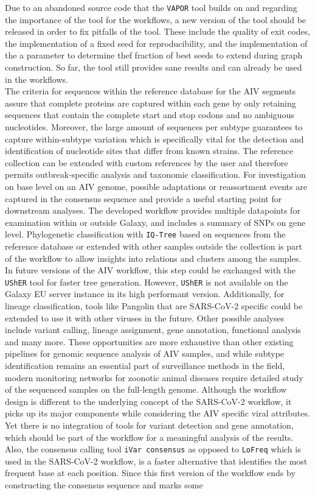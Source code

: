 Due to an abandoned source code that the \texttt{VAPOR} tool builds on and regarding the importance of the tool for the workflows, a new version of the tool should be released in order to fix pitfalls of the tool. These include the quality of exit codes, the implementation of a fixed seed for reproducibility, and the implementation of the a parameter to determine thef fraction of best seeds to extend during graph construction. So far, the tool still provides sane results and can already be used in the workflows.\\
The criteria for sequences within the reference database for the \ac{AIV} segments assure that complete proteins are captured within each gene by only retaining sequences that contain the complete start and stop codons and no ambiguous nucleotides. Moreover, the large amount of sequences per subtype guarantees to capture within-subtype variation which is specifically vital for the detection and identification of nucleotide sites that differ from known strains. The reference collection can be extended with custom references by the user and therefore permits outbreak-specific analysis and taxonomic classification. For investigation on base level on an \ac{AIV} genome, possible adaptations or reassortment events are captured in the consensus sequence and provide a useful starting point for downstream analyses. The developed workflow provides multiple datapoints for examination within or outside Galaxy, and includes a summary of \acp{SNP} on gene level. Phylogenetic classification with \texttt{IQ-Tree} based on sequences from the reference database or extended with other samples outside the collection is part of the workflow to allow insights into relations and clusters among the samples. In future versions of the \ac{AIV} workflow, this step could be exchanged with the \texttt{UShER} tool for faster tree generation. However, \texttt{UShER} is not available on the Galaxy EU server instance in its high performant version. Additionally, for lineage classification, tools like \texttt{}{Pangolin} that are \ac{SARS-CoV-2} specific could be extended to use it with other viruses in the future. Other possible analyses include variant calling, lineage assignment, gene annotation, functional analysis and many more. These opportunities are more exhaustive than other existing pipelines for genomic sequence analysis of \ac{AIV} samples, and while subtype identification remains an essential part of surveillance methods in the field, modern monitoring networks for zoonotic animal diseases require detailed study of the sequenced samples on the full-length genome. Although the workflow design is different to the underlying concept of the \ac{SARS-CoV-2} workflow, it picks up its major components while considering the \ac{AIV} specific viral attributes. Yet there is no integration of tools for variant detection and gene annotation, which should be part of the workflow for a meaningful analysis of the results. Also, the consensus calling tool \texttt{iVar consensus} as opposed to \texttt{LoFreq} which is used in the \ac{SARS-CoV-2} workflow, is a faster alternative that identifies the most frequent base at each position. Since this first version of the workflow ends by constructing the consensus sequence and marks some 